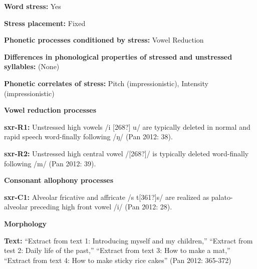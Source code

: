 \begin{styleBody}
\textbf{Word stress: }Yes
\end{styleBody}

\begin{styleBody}
\textbf{Stress placement:} Fixed
\end{styleBody}

\begin{styleBody}
\textbf{Phonetic processes conditioned by stress:} Vowel Reduction
\end{styleBody}

\begin{styleBody}
\textbf{Differences in phonological properties of stressed and unstressed syllables:} (None)
\end{styleBody}

\begin{styleBody}
\textbf{Phonetic correlates of stress: }Pitch (impressionistic), Intensity (impressionistic)
\end{styleBody}

\begin{styleBody}
\textbf{Vowel reduction processes}
\end{styleBody}

\begin{styleBody}
\textbf{sxr-R1: }Unstressed high vowels /i [268?] u/ are typically deleted in normal and rapid speech word-finally following /ŋ/ (Pan 2012: 38).
\end{styleBody}

\begin{styleBody}
\textbf{sxr-R2: }Unstressed high central vowel /[268?]/ is typically deleted word-finally following /m/ (Pan 2012: 39).
\end{styleBody}

\begin{styleBody}
\textbf{Consonant allophony processes}
\end{styleBody}

\begin{styleBody}
\textbf{sxr-C1:} Alveolar fricative and affricate /s t[361?]s/ are realized as palato-alveolar preceding high front vowel /i/ (Pan 2012: 28).
\end{styleBody}

\begin{styleBody}
\textbf{Morphology}
\end{styleBody}

\begin{styleBody}
\textbf{Text:} “Extract from text 1: Introducing myself and my children,” “Extract from test 2: Daily life of the past,” “Extract from text 3: How to make a mat,” “Extract from text 4: How to make sticky rice cakes” (Pan 2012: 365-372)
\end{styleBody}

